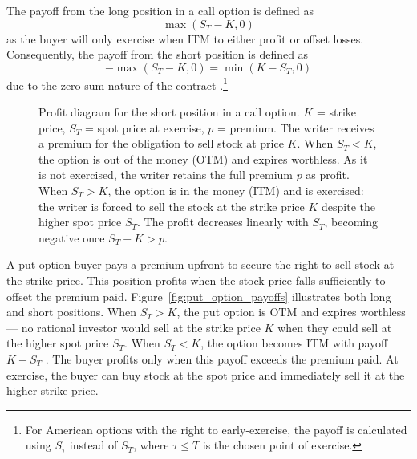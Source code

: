 \documentclass[english,12pt,a4paper,pdftex,sci,utf8]{aaltothesis}
\begin{document}
The payoff from the long position in a call option is defined as
\begin{equation}
    \max(S_T-K,0)
\label{eq:long_call_payoff}
\end{equation}
as the buyer will only exercise when ITM to either profit or offset losses. Consequently, the payoff from the short position is defined as 
\begin{equation*}
    -\max(S_T-K,0) = \min(K-S_T,0)
\end{equation*}
due to the zero-sum nature of the contract \cite{hull2016options}.\footnote{For American options with the right to early-exercise, the payoff is calculated using $S_\tau$ instead of $S_T$, where $\tau \le T$ is the chosen point of exercise.}

\begin{center}
\begin{figure}[H]
\centering
    \caption{Profit diagram for the short position in a call option. $K$ = strike price, $S_T$ = spot price at exercise, $p$ = premium. The writer receives a premium for the obligation to sell stock at price $K$. When $S_T < K$, the option is out of the money (OTM) and expires worthless. As it is not exercised, the writer retains the full premium $p$ as profit. When $S_T > K$, the option is in the money (ITM) and is exercised: the writer is forced to sell the stock at the strike price $K$ despite the higher spot price $S_T$. The profit decreases linearly with $S_T$, becoming negative once $S_T - K > p$.}
    \label{fig:short_call_payoff}
\end{figure}
\end{center}

A put option buyer pays a premium upfront to secure the right to sell stock at the strike price. This position profits when the stock price falls sufficiently to offset the premium paid. Figure~\ref{fig:put_option_payoffs} illustrates both long and short positions. When $S_T > K$, the put option is OTM and expires worthless --- no rational investor would sell at the strike price $K$ when they could sell at the higher spot price $S_T$. When $S_T < K$, the option becomes ITM with payoff $K - S_T$ \cite{hull2013fundamentals}. The buyer profits only when this payoff exceeds the premium paid. At exercise, the buyer can buy stock at the spot price and immediately sell it at the higher strike price.
\end{document}
